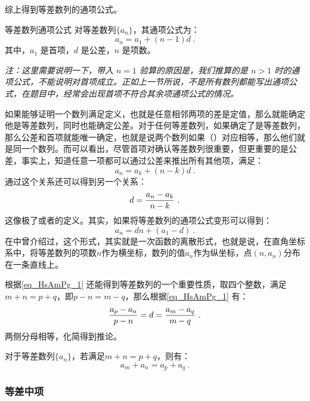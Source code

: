 综上得到等差数列的通项公式。

\begin{corollary}{等差数列通项公式}
对等差数列$\{a_n\}$，其通项公式为：
\begin{equation}
a_n = a_1 + (n - 1)d~.
\end{equation}
其中，$a_1$ 是首项，$d$ 是公差，$n$ 是项数。
\end{corollary}

\textsl{注：这里需要说明一下，带入 $n = 1$ 验算的原因是，我们推算的是 $n > 1$ 时的通项公式，不能说明对首项成立。正如上一节所说，不是所有数列都能写出通项公式，在题目中，经常会出现首项不符合其余项通项公式的情况。}

如果能够证明一个数列满足定义，也就是任意相邻两项的差是定值，那么就能确定他是等差数列，同时也能确定公差。对于任何等差数列，如果确定了是等差数列，那么公差和首项就能唯一确定，也就是说两个数列如果（）对应相等，那么他们就是同一个数列。而可以看出，尽管首项对确认等差数列很重要，但更重要的是公差，事实上，知道任意一项都可以通过公差来推出所有其他项，满足：
\begin{equation}
a_n=a_k+(n-k)d~.
\end{equation}
通过这个关系还可以得到另一个关系：
\begin{equation}\label{eq_HsAmPg_1}
d={a_n-a_k\over n-k}~.
\end{equation}
这像极了或者的定义。其实，如果将等差数列的通项公式变形可以得到：
\begin{equation}
a_n=dn+(a_1-d)~.
\end{equation}
在中曾介绍过，这个形式，其实就是一次函数的离散形式，也就是说，在直角坐标系中，将等差数列的项数$n$作为横坐标，数列的值$a_n$作为纵坐标，点$(n,a_n)$分布在一条直线上。

根据\autoref{eq_HsAmPg_1} 还能得到等差数列的一个重要性质，取四个整数，满足$m+n=p+q$，即$p-n=m-q$，那么根据\autoref{eq_HsAmPg_1} 有：
\begin{equation}
{a_p-a_n\over p-n}=d={a_m-a_q\over m-q}~.
\end{equation}
两侧分母相等，化简得到推论。
\begin{corollary}{}\label{cor_HsAmPg_1}
对于等差数列$\{a_n\}$，若满足$m+n=p+q$，则有：
\begin{equation}
a_m+a_n=a_p+a_q~.
\end{equation}
\end{corollary}

\subsubsection{等差中项}

